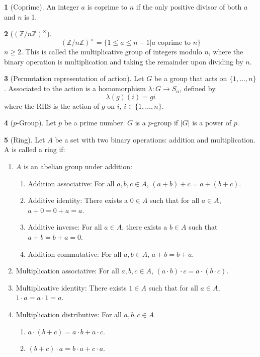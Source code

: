 \documentclass[12pt]{article}
\theoremstyle{definition}
\newtheorem{definition}{\color{NavyBlue}{\textbf{Definition}}}
\begin{document}
\begin{definition}[Coprime]
An integer $a$ is coprime to $n$ if the only positive divisor of both $a$ and $n$ is 1.
\end{definition}

\begin{definition}[$(\mathbb{Z}/n \mathbb{Z})^{\times}$]
\begin{equation}
(\mathbb{Z}/n \mathbb{Z})^{\times} = \{1 \leq a \leq n - 1 | a \text{ coprime to } n\}
\end{equation}
$n \geq 2$. This is called the multiplicative group of integers modulo $n$, where the binary operation is multiplication and taking the remainder upon dividing by $n$.
\end{definition}

\begin{definition}[Permutation representation of action]
Let $G$ be a group that acts on $\{1,\ldots, n\}$. Associated to the action is a homomorphism $\lambda : G \to S_n$, defined by
\begin{equation}
\lambda(g)(i) = gi
\end{equation}
where the RHS is the action of $g$ on $i$, $i \in \{1,\ldots, n\}$.
\end{definition}

\begin{definition}[$p$-Group]
Let $p$ be a prime number. $G$ is a $p$-group if $|G|$ is a power of $p$.
\end{definition}

\begin{definition}[Ring]
Let $A$ be a set with two binary operations: addition and multiplication. A is called a ring if:
\begin{enumerate}
\item $A$ is an abelian group under addition:
\begin{enumerate}
\item Addition associative: For all $a,b,c \in A$, $(a+b) + c = a + (b+c)$.
\item Additive identity: There exists a $0 \in A$ such that for all $a \in A$, $a + 0 = 0 + a = a$.
\item Additive inverse: For all $a \in A$, there exists a $b \in A$ such that $a + b = b + a = 0$.
\item Addition commutative: For all $a,b \in A$, $a + b = b + a$.
\end{enumerate}
\item Multiplication associative: For all $a,b,c \in A$, $(a \cdot b) \cdot c = a \cdot (b \cdot c)$.
\item Multiplicative identity: There exists $1 \in A$ such that for all $a \in A$, $1 \cdot a = a \cdot 1 = a$.
\item Multiplication distributive: For all $a,b,c \in A$
\begin{enumerate}
\item $a \cdot (b + c) = a\cdot b + a \cdot c$.
\item $(b + c) \cdot a = b\cdot a + c \cdot a$.
\end{enumerate}
\end{enumerate}
\end{definition}
\end{document}
